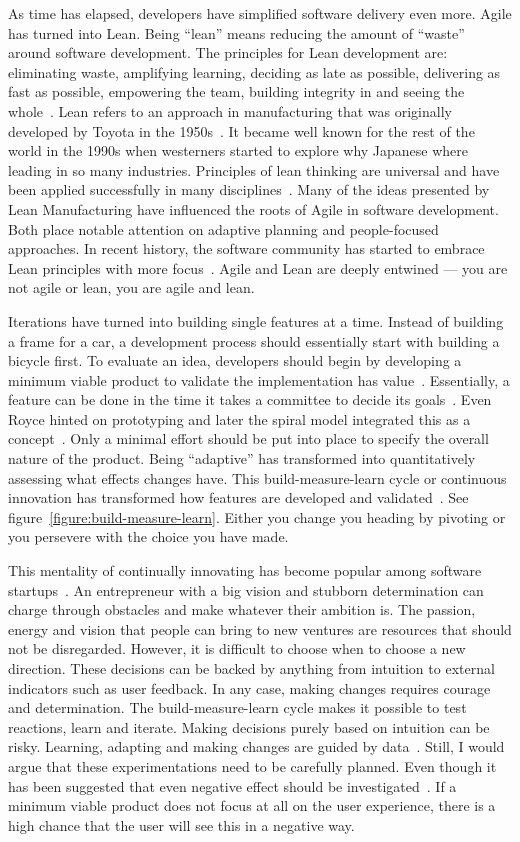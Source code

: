\documentclass[english]{tktltiki2}
\begin{document}
As time has elapsed, developers have simplified software delivery even more. Agile has turned into Lean. Being “lean” means reducing the amount of “waste” around software development. The principles for Lean development are: eliminating waste, amplifying learning, deciding as late as possible, delivering as fast as possible, empowering the team, building integrity in and seeing the whole~\cite{DD08}. Lean refers to an approach in manufacturing that was originally developed by Toyota in the 1950s~\cite{Fow08}. It became well known for the rest of the world in the 1990s when westerners started to explore why Japanese where leading in so many industries. Principles of lean thinking are universal and have been applied successfully in many disciplines~\cite{Pop02}. Many of the ideas presented by Lean Manufacturing have influenced the roots of Agile in software development. Both place notable attention on adaptive planning and people-focused approaches. In recent history, the software community has started to embrace Lean principles with more focus~\cite{Fow08}. Agile and Lean are deeply entwined — you are not agile or lean, you are agile and lean.

Iterations have turned into building single features at a time. Instead of building a frame for a car, a development process should essentially start with building a bicycle first. To evaluate an idea, developers should begin by developing a minimum viable product to validate the implementation has value~\cite{Rie11}. Essentially, a feature can be done in the time it takes a committee to decide its goals~\cite{Pop02}. Even Royce hinted on prototyping and later the spiral model integrated this as a concept~\cite{Roy70, Boe88}. Only a minimal effort should be put into place to specify the overall nature of the product. Being “adaptive” has transformed into quantitatively assessing what effects changes have. This build-measure-learn cycle or continuous innovation has transformed how features are developed and validated~\cite{Rie11}. See figure~\ref{figure:build-measure-learn}. Either you change you heading by pivoting or you persevere with the choice you have made.

This mentality of continually innovating has become popular among software startups~\cite{Rie11}. An entrepreneur with a big vision and stubborn determination can charge through obstacles and make whatever their ambition is. The passion, energy and vision that people can bring to new ventures are resources that should not be disregarded. However, it is difficult to choose when to choose a new direction. These decisions can be backed by anything from intuition to external indicators such as user feedback. In any case, making changes requires courage and determination. The build-measure-learn cycle makes it possible to test reactions, learn and iterate. Making decisions purely based on intuition can be risky. Learning, adapting and making changes are guided by data~\cite{Rie11}. Still, I would argue that these experimentations need to be carefully planned. Even though it has been suggested that even negative effect should be investigated~\cite{KLS09, KDF12, Bos12}. If a minimum viable product does not focus at all on the user experience, there is a high chance that the user will see this in a negative way.
\end{document}
